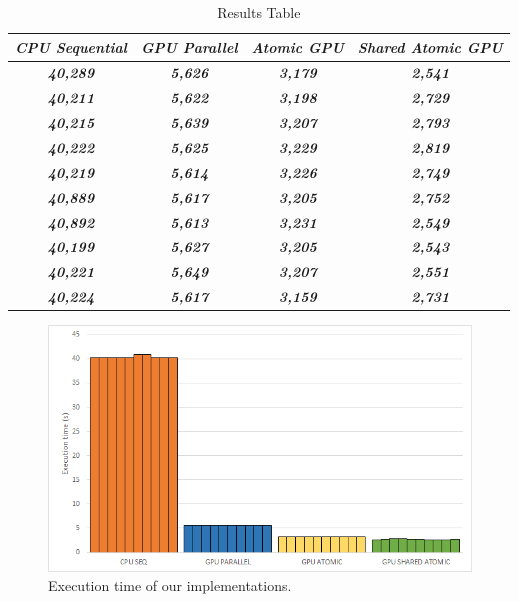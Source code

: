 \documentclass[conference]{IEEEtran}
\begin{document}
\begin{table}[htbp]
	\caption{Results Table} %
	\begin{center}
		\begin{tabular}{|c|c|c|c|}
		\hline
			\textbf{\textit{CPU Sequential}} & \textbf{\textit{GPU Parallel}} & \textbf{\textit{Atomic GPU}} & \textbf{\textit{Shared Atomic GPU}} \\ \hline
			\textbf{\textit{40,289}} & \textbf{\textit{5,626}} & \textbf{\textit{3,179}} & \textbf{\textit{2,541}} \\ \hline
			\textbf{\textit{40,211}} & \textbf{\textit{5,622}} & \textbf{\textit{3,198}} & \textbf{\textit{2,729}} \\ \hline
			\textbf{\textit{40,215}} & \textbf{\textit{5,639}} & \textbf{\textit{3,207}} & \textbf{\textit{2,793}} \\ \hline
			\textbf{\textit{40,222}} & \textbf{\textit{5,625}} & \textbf{\textit{3,229}} & \textbf{\textit{2,819}} \\ \hline
			\textbf{\textit{40,219}} & \textbf{\textit{5,614}} & \textbf{\textit{3,226}} & \textbf{\textit{2,749}} \\ \hline
			\textbf{\textit{40,889}} & \textbf{\textit{5,617}} & \textbf{\textit{3,205}} & \textbf{\textit{2,752}} \\ \hline
			\textbf{\textit{40,892}} & \textbf{\textit{5,613}} & \textbf{\textit{3,231}} & \textbf{\textit{2,549}} \\ \hline
			\textbf{\textit{40,199}} & \textbf{\textit{5,627}} & \textbf{\textit{3,205}} & \textbf{\textit{2,543}} \\ \hline
			\textbf{\textit{40,221}} & \textbf{\textit{5,649}} & \textbf{\textit{3,207}} & \textbf{\textit{2,551}} \\ \hline
			\textbf{\textit{40,224}} & \textbf{\textit{5,617}} & \textbf{\textit{3,159}} & \textbf{\textit{2,731}} \\ \hline
	\end{tabular}
	\label{tab1}
	\end{center}
\end{table}

\begin{figure}[htbp]
	\centerline{\includegraphics[width=\linewidth]{figures/graph_results.png}}
	\caption{Execution time of our implementations.}
	\label{fig1}
\end{figure}
\end{document}
